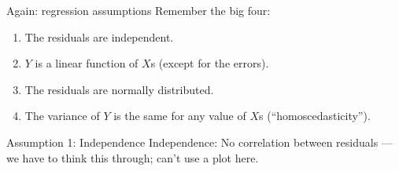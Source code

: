 \documentclass{beamer}\usepackage[]{graphicx}\usepackage[]{color}
\makeatletter
\newcommand{\hlopt}[1]{\textcolor[rgb]{1,0.894,0.769}{#1}}%
\newcommand{\hlstd}[1]{\textcolor[rgb]{1,0.894,0.769}{#1}}%
\newcommand{\hlkwd}[1]{\textcolor[rgb]{1,0.78,0.769}{#1}}%
\newenvironment{kframe}{%
 \def\at@end@of@kframe{}%
 \ifinner\ifhmode%
  \def\at@end@of@kframe{\end{minipage}}%
  \begin{minipage}{\columnwidth}%
 \fi\fi%
 \def\FrameCommand##1{\hskip\@totalleftmargin \hskip-\fboxsep
 \colorbox{shadecolor}{##1}\hskip-\fboxsep
     \hskip-\linewidth \hskip-\@totalleftmargin \hskip\columnwidth}%
 \MakeFramed {\advance\hsize-\width
   \@totalleftmargin\z@ \linewidth\hsize
   \@setminipage}}%
 {\par\unskip\endMakeFramed%
 \at@end@of@kframe}
\newenvironment{knitrout}{}{} %
\makeatother
\begin{document}
\begin{darkframes}
    
    
    
    \begin{frame}{Again: regression assumptions}
    \fontsize{9}{9}\selectfont
      Remember the big four:
      \begin{enumerate}
        \item \alert{The residuals are independent.}
        \item $Y$ is a linear function of $X$s (except for the errors).
        \item The residuals are normally distributed.
        \item The variance of $Y$ is the same for any value of $X$s (``homoscedasticity'').
    
      \end{enumerate}
    \end{frame}
    
    
    \begin{frame}[fragile]{Assumption 1: Independence}
    \fontsize{9}{9}\selectfont
      Independence: No correlation between residuals \pause --- we have to think this through; can't use a plot here.
    \end{frame}
    

    
    

\end{darkframes}
\end{document}
